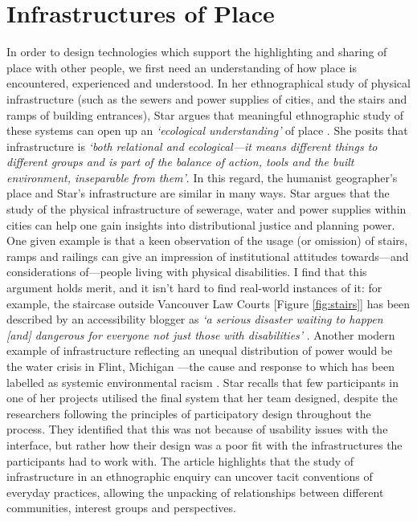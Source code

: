 \section{Infrastructures of Place}
\label{sec:InfrastructuresOfPlace}
In order to design technologies which support the highlighting and sharing of place with other people, we first need an understanding of how place is encountered, experienced and understood. In her ethnographical study of physical infrastructure (such as the sewers and power supplies of cities, and the stairs and ramps of building entrances), Star argues that meaningful ethnographic study of these systems can open up an \textit{`ecological understanding'} of place \citep{Star1999}. She posits that infrastructure is \textit{`both relational and ecological---it means different things to different groups and is part of the balance of action, tools and the built environment, inseparable from them'}. In this regard, the humanist geographer's place and Star's infrastructure are similar in many ways. Star argues that the study of the physical infrastructure of sewerage, water and power supplies within cities can help one gain insights into distributional justice and planning power. One given example is that a keen observation of the usage (or omission) of stairs, ramps and railings can give an impression of institutional attitudes towards---and considerations of---people living with physical disabilities. I find that this argument holds merit, and it isn't hard to find real-world instances of it: for example, the staircase outside Vancouver Law Courts [Figure \ref{fig:stairs}] has been described by an accessibility blogger as \textit{`a serious disaster waiting to happen [and] dangerous for everyone not just those with disabilities'} \citep{Wheeler-Hall2017}. Another modern example of infrastructure reflecting an unequal distribution of power would be the water crisis in Flint, Michigan \citep{Clark2018}---the cause and response to which has been labelled as systemic environmental racism \citep{MichiganCivilRightsCommission2017a}. Star recalls that few participants in one of her projects utilised the final system that her team designed, despite the researchers following the principles of participatory design throughout the process. They identified that this was not because of usability issues with the interface, but rather how their design was a poor fit with the infrastructures the participants had to work with. The article highlights that the study of infrastructure in an ethnographic enquiry can uncover tacit conventions of everyday practices, allowing the unpacking of relationships between different communities, interest groups and perspectives.

